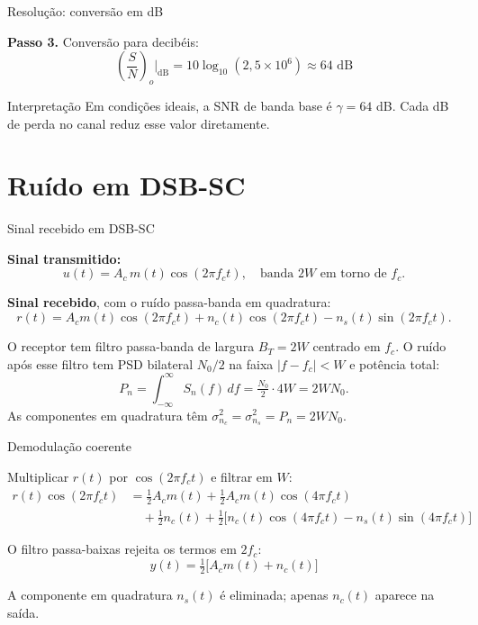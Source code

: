 
\begin{frame}{Resolução: conversão em dB}

\textbf{Passo 3.} Conversão para decibéis:
\[
\left(\frac{S}{N}\right)_o\Big|_{\text{dB}} = 10\log_{10}(2{,}5 \times 10^{6}) \approx 64 \text{ dB}
\]

\begin{block}{Interpretação}
Em condições ideais, a SNR de banda base é $\gamma = 64$ dB. Cada dB de perda no canal reduz esse valor diretamente.
\end{block}

\end{frame}


\section{Ruído em DSB-SC}

\begin{frame}{Sinal recebido em DSB-SC}

\textbf{Sinal transmitido:}
\[
u(t) = A_c\, m(t)\cos(2\pi f_c t), \quad \text{banda } 2W \text{ em torno de } f_c.
\]

\vspace{0.2cm}

\textbf{Sinal recebido}, com o ruído passa-banda em quadratura:
\[
r(t) = A_c m(t)\cos(2\pi f_c t) + n_c(t)\cos(2\pi f_c t) - n_s(t)\sin(2\pi f_c t).
\]

\vspace{0.2cm}

O receptor tem filtro passa-banda de largura $B_T = 2W$ centrado em $f_c$. O ruído após esse filtro tem PSD bilateral $N_0/2$ na faixa $|f-f_c|<W$ e potência total:
\[
P_n = \int_{-\infty}^{\infty} S_n(f)\,df = \tfrac{N_0}{2}\cdot 4W = 2 W N_0.
\]
As componentes em quadratura têm $\sigma^2_{n_c} = \sigma^2_{n_s} = P_n = 2 W N_0$.

\end{frame}


\begin{frame}{Demodulação coerente}

Multiplicar $r(t)$ por $\cos(2\pi f_c t)$ e filtrar em $W$:
\begin{align*}
r(t)\cos(2\pi f_c t)
&= \tfrac{1}{2} A_c m(t) + \tfrac{1}{2} A_c m(t)\cos(4\pi f_c t) \\
&\quad + \tfrac{1}{2} n_c(t) + \tfrac{1}{2}\bigl[n_c(t)\cos(4\pi f_c t) - n_s(t)\sin(4\pi f_c t)\bigr]
\end{align*}

O filtro passa-baixas rejeita os termos em $2f_c$:
\[
\boxed{y(t) = \tfrac{1}{2}\bigl[A_c m(t) + n_c(t)\bigr]}
\]

\vspace{0.2cm}

A componente em quadratura $n_s(t)$ é eliminada; apenas $n_c(t)$ aparece na saída.

\end{frame}

